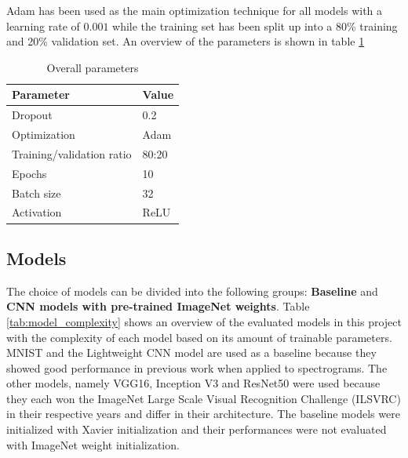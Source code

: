 \documentclass{article}
\theoremstyle{definition}
\theoremstyle{remark}
\begin{document}
Adam \cite{kingma2014adam} has been used as the main optimization technique for all models with a learning rate of $0.001$ while the training set has been split up into a 80\% training and 20\% validation set. An overview of the parameters is shown in table \ref{tab:overall_parameters}


\begin{table}[h!]
\center
\begin{tabular}{|l|l|}
\hline
\textbf{Parameter} & \textbf{Value}  \\ \hline
Dropout & 0.2 \\ \hline
Optimization & Adam\\ \hline
Training/validation ratio & 80:20\\ \hline
Epochs & 10 \\ \hline
Batch size & 32 \\ \hline
Activation & ReLU \\ \hline
\end{tabular}
\caption{Overall parameters}
\label{tab:overall_parameters}
\end{table}

\newpage


\subsection{Models} \label{models}

The choice of models can be divided into the following groups: \textbf{Baseline} and \textbf{CNN models with pre-trained ImageNet weights}. Table \ref{tab:model_complexity} shows an overview of the evaluated models in this project with the complexity of each model based on its amount of trainable parameters.\\
MNIST and the Lightweight CNN model are used as a baseline because they showed good performance in previous work when applied to spectrograms. The other models, namely VGG16, Inception V3 and ResNet50 were used because they each won the ImageNet Large Scale Visual Recognition Challenge (ILSVRC) in their respective years and differ in their architecture. The baseline models were initialized with Xavier initialization and their performances were not evaluated with ImageNet weight initialization.\\
\end{document}
